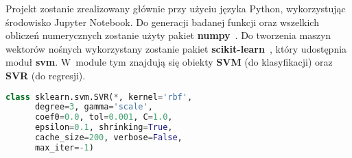 Projekt zostanie zrealizowany głównie przy użyciu języka Python, wykorzystując środowisko Jupyter Notebook. Do generacji badanej funkcji oraz wszelkich obliczeń numerycznych zostanie użyty pakiet \textbf{numpy}~\cite{numpy}. Do tworzenia maszyn wektorów nośnych wykorzystany zostanie pakiet \textbf{scikit-learn}~\cite{scikit-learn}, który udostępnia moduł \textbf{svm}. W~module tym znajdują się obiekty \textbf{SVM} (do klasyfikacji) oraz \textbf{SVR} (do regresji). 

\begin{lstlisting}[language=Python, captionpos=b, caption=Nagłówek klasy sklearn.svm.SVR]
class sklearn.svm.SVR(*, kernel='rbf', 
      degree=3, gamma='scale', 
      coef0=0.0, tol=0.001, C=1.0, 
      epsilon=0.1, shrinking=True, 
      cache_size=200, verbose=False, 
      max_iter=-1)
\end{lstlisting}
